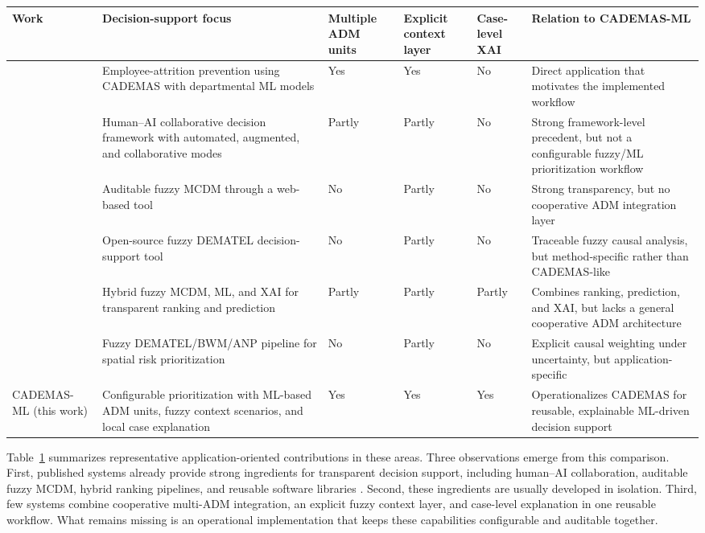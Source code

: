 \documentclass{interact}
\begin{document}
\begin{table}[!tb]
{\footnotesize
\begin{tabularx}{\textwidth}{>{\raggedright\arraybackslash}p{1.85cm} >{\raggedright\arraybackslash}X >{\centering\arraybackslash}p{1.35cm} >{\centering\arraybackslash}p{1.35cm} >{\centering\arraybackslash}p{1.35cm} >{\raggedright\arraybackslash}X}
		\toprule
		\textbf{Work} & \textbf{Decision-support focus} & \textbf{Multiple ADM units} & \textbf{Explicit context layer} & \textbf{Case-level XAI} & \textbf{Relation to CADEMAS-ML} \\
		\midrule
		\citet{Godz2026} & Employee-attrition prevention using CADEMAS with departmental ML models & Yes & Yes & No & Direct application that motivates the implemented workflow \\
		\citet{Tariq2024a} & Human--AI collaborative decision framework with automated, augmented, and collaborative modes & Partly & Partly & No & Strong framework-level precedent, but not a configurable fuzzy/ML prioritization workflow \\
		\citet{Wieckowski2024} & Auditable fuzzy MCDM through a web-based tool & No & Partly & No & Strong transparency, but no cooperative ADM integration layer \\
		\citet{Chekry2024} & Open-source fuzzy DEMATEL decision-support tool & No & Partly & No & Traceable fuzzy causal analysis, but method-specific rather than CADEMAS-like \\
		\citet{Ozkurt2025} & Hybrid fuzzy MCDM, ML, and XAI for transparent ranking and prediction & Partly & Partly & Partly & Combines ranking, prediction, and XAI, but lacks a general cooperative ADM architecture \\
		\citet{Sahraei2022} & Fuzzy DEMATEL/BWM/ANP pipeline for spatial risk prioritization & No & Partly & No & Explicit causal weighting under uncertainty, but application-specific \\
		\midrule
		CADEMAS-ML (this work) & Configurable prioritization with ML-based ADM units, fuzzy context scenarios, and local case explanation & Yes & Yes & Yes & Operationalizes CADEMAS for reusable, explainable ML-driven decision support \\
		\bottomrule
	\end{tabularx}}
\label{tab:related}
\end{table}

Table~\ref{tab:related} summarizes representative application-oriented contributions in these areas. Three observations emerge from this comparison. First, published systems already provide strong ingredients for transparent decision support, including human--AI collaboration, auditable fuzzy MCDM, hybrid ranking pipelines, and reusable software libraries \citep{Tariq2024a,Wieckowski2024,Ozkurt2025,Wieckowski2022}. Second, these ingredients are usually developed in isolation. Third, few systems combine cooperative multi-ADM integration, an explicit fuzzy context layer, and case-level explanation in one reusable workflow. What remains missing is an operational implementation that keeps these capabilities configurable and auditable together.
\end{document}
